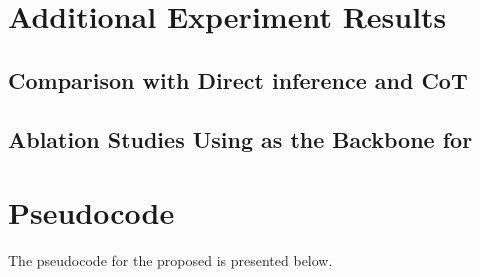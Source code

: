\section{Additional Experiment Results}

\subsection{Comparison \hero with Direct inference and CoT}
\label{app:additional_res_direct}


\subsection{Ablation Studies Using \llama as the Backbone for \hero}
\label{app: ablte_llama}






\section{Pseudocode}
\label{app:pseducode}

The pseudocode for the proposed \hero{} is presented below.











